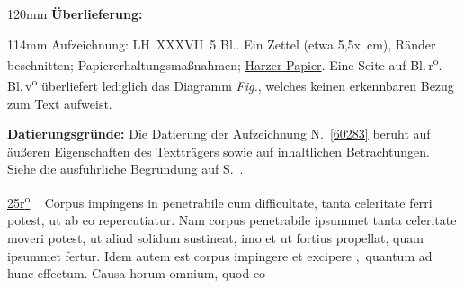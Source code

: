 \begin{ledgroupsized}[r]{120mm}
\footnotesize
\pstart
\noindent\textbf{Überlieferung:}
\pend
\end{ledgroupsized}
\begin{ledgroupsized}[r]{114mm}
\footnotesize
\pstart \parindent -6mm
%
Aufzeichnung:
LH~XXXVII~5 Bl..
Ein Zettel (etwa 5,5\;x~cm),
Ränder beschnitten;
Papiererhaltungsmaßnahmen;
\href{\Scan{LH_37_05_025wz}}{Harzer Papier}.
Eine Seite auf Bl.\,r\textsuperscript{o}.
Bl.\,v\textsuperscript{o} überliefert lediglich das Diagramm \lbrack\textit{Fig.}\rbrack,
welches keinen erkennbaren Bezug zum Text aufweist.
\pend%
\end{ledgroupsized}
\vspace{5mm}
\begin{ledgroup}
\footnotesize
\pstart
\noindent%
\textbf{Datierungsgründe:}
Die Datierung der Aufzeichnung N.~\ref{60283} beruht auf äußeren Eigenschaften des Text\-trägers %
sowie auf inhaltlichen Betrachtungen.
Siehe die ausführliche Begründung auf S.~\pageref{60283_dat}.
\pend%
\end{ledgroup}%
%
\frenchspacing%
\vspace{8mm}%
\normalsize%
\pstart%
\noindent%
\lbrack%
\href{\Scan{LH_37_05_025r}}%
{25\:r\textsuperscript{o}}%
\rbrack\ %
Corpus impingens%
in penetrabile%
cum difficultate,%
tanta celeritate ferri potest,%
ut ab eo repercutiatur.%
Nam corpus penetrabile ipsummet%
tanta celeritate moveri potest,%
ut aliud solidum sustineat,%
imo et ut fortius propellat,
quam ipsummet
%
fertur.%
Idem autem est
corpus impingere et excipere%
\lbrack,\rbrack\
quantum ad hunc effectum.
\pend%
\pstart%
Causa%
horum omnium,
quod eo
